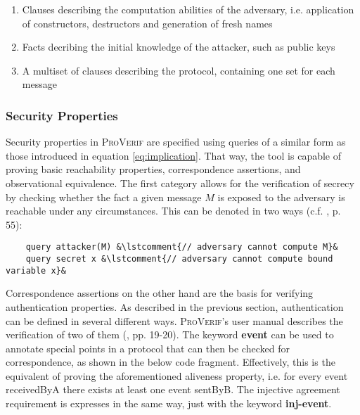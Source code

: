 \begin{enumerate}[label=--]
    \item Clauses describing the computation abilities of the adversary, i.e. application of constructors, destructors and generation of fresh names
    \item Facts decribing the initial knowledge of the attacker, such as public keys
    \item A multiset of clauses describing the protocol, containing one set for each message
\end{enumerate}

\subsubsection{Security Properties}

Security properties in \textsc{ProVerif} are specified using queries of a similar form as those introduced in equation \ref{eq:implication}.
That way, the tool is capable of proving basic reachability properties, correspondence assertions, and observational equivalence.
The first category allows for the verification of secrecy by checking whether the fact a given message $M$ is exposed to the adversary is reachable under any circumstances.
This can be denoted in two ways (c.f. \cite{blanchet2020proverif}, p. 55):

\begin{lstlisting}
    query attacker(M) &\lstcomment{// adversary cannot compute M}&
    query secret x &\lstcomment{// adversary cannot compute bound variable x}&
\end{lstlisting}

Correspondence assertions on the other hand are the basis for verifying authentication properties.
As described in the previous section, authentication can be defined in several different ways.
\textsc{ProVerif}'s user manual describes the verification of two of them (\cite{blanchet2020proverif}, pp. 19-20).
The keyword \textsf{\textbf{event}} can be used to annotate special points in a protocol that can then be checked for correspondence, as shown in the below code fragment.
Effectively, this is the equivalent of proving the aforementioned aliveness property, i.e. for every event \textsf{receivedByA} there exists at least one event \textsf{sentByB}.
The injective agreement requirement is expresses in the same way, just with the keyword \textsf{\textbf{inj-event}}.

